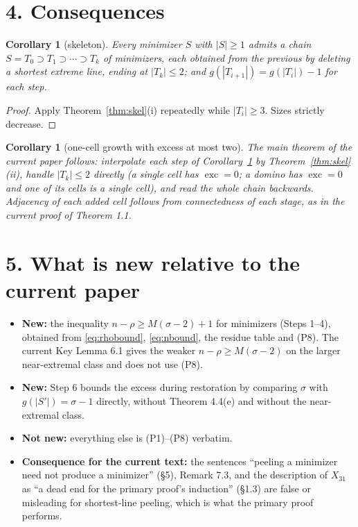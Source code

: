 \documentclass[11pt]{article}
\theoremstyle{plain}
\newtheorem{corollary}[theorem]{Corollary}
\theoremstyle{remark}
\DeclareMathOperator{\exc}{exc}
\begin{document}
\section*{4. Consequences}

\begin{corollary}[skeleton]\label{cor:skel}
Every minimizer \(S\) with \(|S|\ge1\) admits a chain
\(S=T_{0}\supset T_{1}\supset\cdots\supset T_{k}\) of minimizers, each obtained from the
previous by deleting a shortest extreme line, ending at \(|T_{k}|\le2\); and
\(g(|T_{i+1}|)=g(|T_{i}|)-1\) for each step.
\end{corollary}

\begin{proof}
Apply Theorem~\ref{thm:skel}(i) repeatedly while \(|T_{i}|\ge3\). Sizes strictly decrease.
\end{proof}

\begin{corollary}[one-cell growth with excess at most two]\label{cor:growth}
The main theorem of the current paper follows: interpolate each step of
Corollary~\ref{cor:skel} by Theorem~\ref{thm:skel}(ii), handle \(|T_{k}|\le2\) directly
(a single cell has \(\exc=0\); a domino has \(\exc=0\) and one of its cells is a single cell),
and read the whole chain backwards. Adjacency of each added cell follows from connectedness
of each stage, as in the current proof of Theorem 1.1.
\end{corollary}

\section*{5. What is new relative to the current paper}

\begin{itemize}
\item \textbf{New:} the inequality \(n-\rho\ge M(\sigma-2)+1\) for minimizers (Steps 1--4),
obtained from \eqref{eq:rhobound}, \eqref{eq:nbound}, the residue table and (P8). The current
Key Lemma 6.1 gives the weaker \(n-\rho\ge M(\sigma-2)\) on the larger near-extremal class and
does not use (P8).
\item \textbf{New:} Step 6 bounds the excess during restoration by comparing \(\sigma\) with
\(g(|S'|)=\sigma-1\) directly, without Theorem 4.4(e) and without the near-extremal class.
\item \textbf{Not new:} everything else is (P1)--(P8) verbatim.
\item \textbf{Consequence for the current text:} the sentences ``peeling a minimizer need
not produce a minimizer'' (\S5), Remark 7.3, and the description of \(X_{31}\) as ``a dead
end for the primary proof's induction'' (\S1.3) are false or misleading for shortest-line
peeling, which is what the primary proof performs.
\end{itemize}
\end{document}

